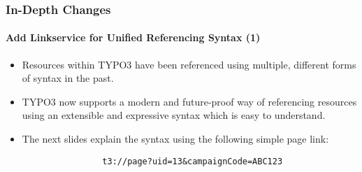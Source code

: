 \begin{frame}[fragile]
	\frametitle{In-Depth Changes}
	\framesubtitle{Add Linkservice for Unified Referencing Syntax (1)}

	\begin{itemize}

		\item Resources within TYPO3 have been referenced using multiple, different forms of syntax in the past.

		\item TYPO3 now supports a modern and future-proof way of referencing resources using an extensible and
			expressive syntax which is easy to understand.

		\item The next slides explain the syntax using the following simple page link:

			\begin{lstlisting}
				t3://page?uid=13&campaignCode=ABC123
			\end{lstlisting}

	\end{itemize}

\end{frame}

